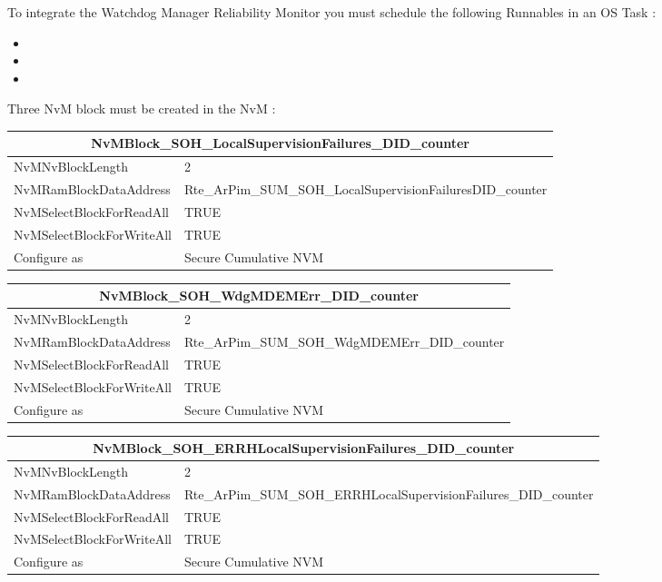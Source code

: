 To integrate the Watchdog Manager Reliability Monitor you must schedule the following Runnables in an OS Task :

\begin{itemize}
    \item {}
    \item {}
	\item {}
\end{itemize}


Three NvM block must be created in the NvM :

\begin{tabular}{|l|p{10.5cm}|}\hline
\multicolumn{2}{|c|}{\textbf{NvMBlock\_SOH\_LocalSupervisionFailures\_DID\_counter}}\\\hline
NvMNvBlockLength&2\\\hline
NvMRamBlockDataAddress&Rte\_ArPim\_SUM\_SOH\_LocalSupervisionFailuresDID\_counter\\\hline
NvMSelectBlockForReadAll&TRUE\\\hline
NvMSelectBlockForWriteAll&TRUE\\\hline
Configure as&Secure Cumulative NVM\\\hline
\end{tabular}

\begin{tabular}{|l|p{10.5cm}|}\hline
\multicolumn{2}{|c|}{\textbf{NvMBlock\_SOH\_WdgMDEMErr\_DID\_counter}}\\\hline
NvMNvBlockLength&2\\\hline
NvMRamBlockDataAddress&Rte\_ArPim\_SUM\_SOH\_WdgMDEMErr\_DID\_counter\\\hline
NvMSelectBlockForReadAll&TRUE\\\hline
NvMSelectBlockForWriteAll&TRUE\\\hline
Configure as&Secure Cumulative NVM\\\hline
\end{tabular}

\begin{tabular}{|l|p{10.5cm}|}\hline
\multicolumn{2}{|c|}{\textbf{NvMBlock\_SOH\_ERRHLocalSupervisionFailures\_DID\_counter}}\\\hline
NvMNvBlockLength&2\\\hline
NvMRamBlockDataAddress&Rte\_ArPim\_SUM\_SOH\_ERRHLocalSupervisionFailures\_DID\_counter\\\hline
NvMSelectBlockForReadAll&TRUE\\\hline
NvMSelectBlockForWriteAll&TRUE\\\hline
Configure as&Secure Cumulative NVM\\\hline
\end{tabular}


